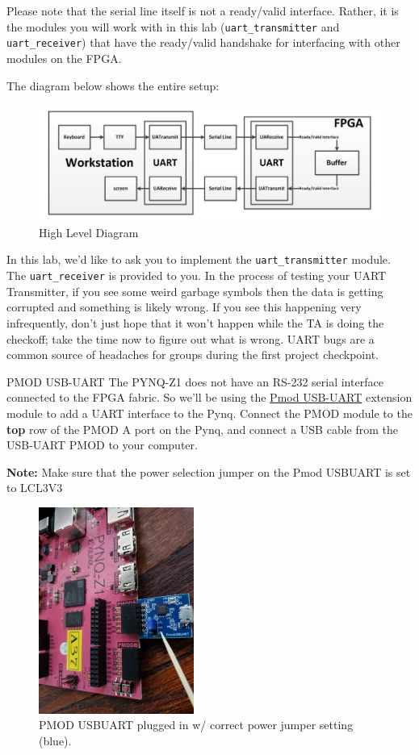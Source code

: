 \documentclass[11pt]{article}
\makeatletter
\renewcommand{\subsection}
{\@startsection {subsection}{1}{0pt}
 {-1ex}
 {0.5ex}
 {\bfseries\normalsize}}
\makeatother
\begin{document}
Please note that the serial line itself is not a ready/valid interface.
Rather, it is the modules you will work with in this lab (\verb|uart_transmitter| and \verb|uart_receiver|) that have the ready/valid handshake for interfacing with other modules on the FPGA.

The diagram below shows the entire setup:

\begin{figure}[H]
  \centerline{\includegraphics[width=6in]{figs/high_level_diagram.png}}
  \caption{High Level Diagram}
\end{figure}

In this lab, we'd like to ask you to implement the \verb|uart_transmitter| module. The \verb|uart_receiver| is provided to you.
In the process of testing your UART Transmitter, if you see some weird garbage symbols then the data is getting corrupted and something is likely wrong.
If you see this happening very infrequently, don't just hope that it won't happen while the TA is doing the checkoff; take the time now to figure out what is wrong.
UART bugs are a common source of headaches for groups during the first project checkpoint.

\subsection{PMOD USB-UART}
The PYNQ-Z1 does not have an RS-232 serial interface connected to the FPGA fabric.
So we'll be using the \href{https://store.digilentinc.com/pmod-usbuart-usb-to-uart-interface/}{Pmod USB-UART} extension module to add a UART interface to the Pynq.
Connect the PMOD module to the \textbf{top} row of the PMOD A port on the Pynq, and connect a USB cable from the USB-UART PMOD to your computer.

\textbf{Note:} Make sure that the power selection jumper on the Pmod USBUART is set to LCL3V3

\begin{figure}[H]
  \centerline{\includegraphics[width=2in]{figs/pmod_a.jpg}}
  \caption{PMOD USBUART plugged in w/ correct power jumper setting (blue).}
\end{figure}
\end{document}
